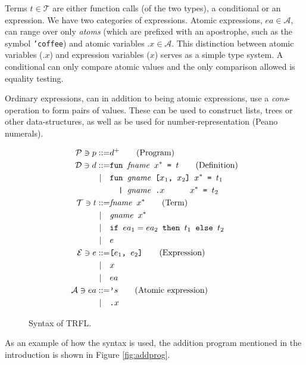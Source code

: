 \documentclass[10pt]{../sigplanconf}
\begin{document}
Terms $t \in \mathcal{T}$ are either function calls (of the two
types), a conditional or an expression. We have two categories of
expressions. Atomic expressions, $ea \in \mathcal{A}$, can range over
only \textit{atoms} (which are prefixed with an apostrophe, such as
the symbol \texttt{'coffee}) and atomic variables $\texttt{.}x \in
\mathcal{A}$. This distinction between atomic variables
($\texttt{.}x$) and expression variables ($x$) serves as a simple type
system. A conditional can only compare atomic values and the only
comparison allowed is equality testing.

Ordinary expressions, can in addition to being atomic expressions, use
a \textit{cons}-operation to form pairs of values. These can be used
to construct lists, trees or other data-structures, as well as be used
for number-representation (Peano numerals).

\begin{figure}\centering
  \begin{align*}
    \mathcal{P} \ni p ::= & d^{+}\tag{Program}\\
    \mathcal{D} \ni d ::= &\texttt{fun \textit{\rmfamily fname} $x^{*}$ = $t$}  \tag{Definition} \\
    | \quad &\texttt{fun \textit{\rmfamily gname} [$x_1$, $x_2$] $x^{*}$ = $t_1$} \\
    & \texttt{\ \ | \textit{\rmfamily gname}\ \texttt{.}$x$ \hspace{.7cm} $x^{*}$ = $t_2$}\\
    \mathcal{T} \ni t ::= & \texttt{\textit{\rmfamily fname} $x^{*}$}  \tag{Term}\\
    | \quad & \texttt{\textit{\rmfamily gname} $x^{*}$} \\
    | \quad & \texttt{if $ea_1 = ea_2$ then $t_1$ else $t_2$} \\
    | \quad & e \\
    \mathcal{E} \ni e ::= & \texttt{[$e_1$, $e_2$]} \tag{Expression}\\
    | \quad & x \\
    | \quad & ea \\
    \mathcal{A} \ni ea ::= & \texttt{'}s \tag{Atomic expression}\\
    | \quad & \texttt{.}x
  \end{align*}
  \caption{Syntax of TRFL.}
\label{fig:bnf}
\end{figure}

As an example of how the syntax is used, the addition program
mentioned in the introduction is shown in Figure \ref{fig:addprog}.
\end{document}
